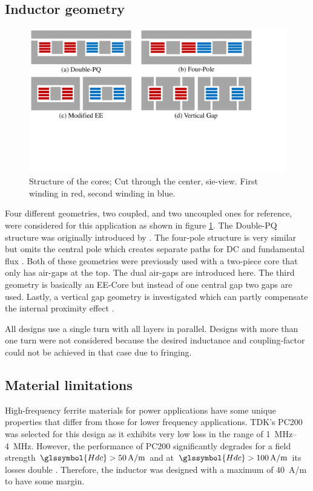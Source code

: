 \documentclass{IPEC2026}
\newcommand{\sbl}[1]{\glssymbol{#1}}
\begin{document}
\subsection{Inductor geometry}
\begin{figure}
  \includegraphics[page=1, trim = 0cm 7cm 4.5cm 0cm, clip, width=\columnwidth]{figures/IPEC_Figures_PowerPoint.pdf}
  \caption{Structure of the cores; Cut through the center, sie-view. First winding in red, second winding in blue.}
  \label{fig:Core_Drawings}
\end{figure}
Four different geometries, two coupled, and two uncoupled ones for reference, were considered for this application as shown in figure \ref{fig:Core_Drawings}. The Double-PQ structure was originally introduced by \cite{wangPCBWindingBasedCoupled2023}. The four-pole structure is very similar but omits the central pole which creates separate paths for DC and fundamental flux \cite{huaUltrathinCoupledInductor2021}. Both of these geometries were previously used with a two-piece core that only has air-gaps at the top. The dual air-gaps are introduced here. The third geometry is basically an EE-Core but instead of one central gap two gaps are used. Lastly, a vertical gap geometry is investigated which can partly compensate the internal proximity effect \cite{schaferNovelHighlyEfficient2020}. %
\par All designs use a single turn with all layers in parallel. Designs with more than one turn were not considered because the desired inductance and coupling-factor could not be achieved in that case due to fringing.

\subsection{Material limitations}
High-frequency ferrite materials for power applications have some unique properties that differ from those for lower frequency applications. TDK's PC200 was selected for this design as it exhibits very low loss in the range of \qtyrange{1}{4}{\MHz}. However, the performance of PC200 significantly degrades for a field strength $\sbl{Hdc} > \qty{50}{A/m}$ and at $\sbl{Hdc} > \qty{100}{A/m}$ its losses double \cite{tdkHighFrequencyLowLossFerrite}. Therefore, the inductor was designed with a maximum \sbl{Hdc} of \qty{40}{A/m} to have some margin.
\end{document}
